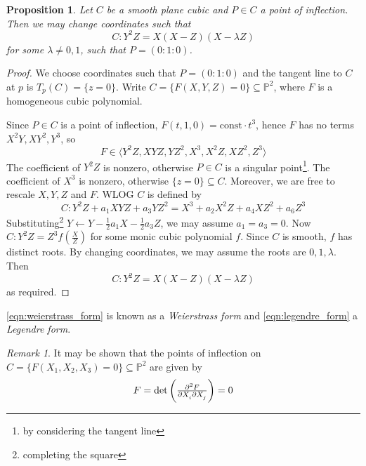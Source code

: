 \documentclass[11pt]{article}
\theoremstyle{definition}
\theoremstyle{plain}
\newtheorem{proposition}[definition]{Proposition}
\theoremstyle{remark}
\newtheorem*{remark*}{Remark}
\newcommand{\PP}{\mathbb{P}}
\begin{document}
\begin{proposition}\label{prop:2_7}
    Let $C$ be a smooth plane cubic and $P \in C$ a point of inflection. Then we may change coordinates such that
    \begin{equation*}
        C : Y^2 Z = X (X-Z) (X-\lambda Z)
    \end{equation*}
    for some $\lambda \neq 0, 1$, such that $P = (0:1:0)$.
\end{proposition}
\begin{proof}
    We choose coordinates such that $P = (0:1:0)$ and the tangent line to $C$ at $p$ is $T_p(C) = \{z=0\}$. Write $C = \{F(X,Y,Z) = 0\} \subseteq \PP^2$, where $F$ is a homogeneous cubic polynomial.

    Since $P \in C$ is a point of inflection, $F(t,1,0) = \text{const} \cdot t^3$, hence $F$ has no terms $X^2Y, XY^2, Y^3$, so
    \begin{equation*}
        F \in \langle Y^2Z, XYZ, YZ^2, X^3, X^2Z, XZ^2, Z^3 \rangle
    \end{equation*}
    The coefficient of $Y^2 Z$ is nonzero, otherwise $P \in C$ is a singular point\footnote{by considering the tangent line}. The coefficient of $X^3$ is nonzero, otherwise $\{z = 0\} \subseteq C$. Moreover, we are free to rescale $X,Y,Z$ and $F$. WLOG $C$ is defined by
    \begin{equation}\label{eqn:weierstrass_form}
        C : Y^2 Z + a_1 XYZ + a_3 Y Z^2 = X^3 + a_2 X^2 Z + a_4 X Z^2 + a_6 Z^3
    \end{equation}
    Substituting\footnote{completing the square} $Y \leftarrow Y - \frac{1}{2} a_1 X - \frac{1}{2} a_3 Z$, we may assume $a_1 = a_3 = 0$. Now $C : Y^2 Z = Z^3 f(\frac{X}{Z})$ for some monic cubic polynomial $f$. Since $C$ is smooth, $f$ has distinct roots. By changing coordinates, we may assume the roots are $0, 1, \lambda$. Then
    \begin{equation}\label{eqn:legendre_form}
        C : Y^2 Z = X(X-Z)(X-\lambda Z)
    \end{equation}
    as required.
\end{proof}
\noindent\eqref{eqn:weierstrass_form} is known as a \emph{Weierstrass form} and \eqref{eqn:legendre_form} a \emph{Legendre form}.

\begin{remark*}
    It may be shown that the points of inflection on $C = \{F(X_1, X_2, X_3) = 0\} \subseteq \PP^2$ are given by
    \begin{equation*}
        F = \det \bigg(\md{F}{2}{X_i}{}{X_j}{}\bigg) = 0
    \end{equation*}
\end{remark*}
\end{document}
